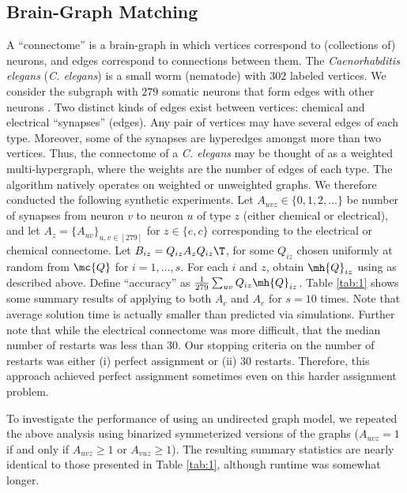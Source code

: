 \documentclass[10pt,journal,cspaper,compsoc]{IEEEtran}
\begin{document}


\subsection{Brain-Graph Matching} %
\label{sub:connectome_classification}

A ``connectome'' is a brain-graph in which vertices correspond to (collections of) neurons, and edges correspond to connections between them. The \emph{Caenorhabditis elegans} (\emph{C. elegans}) is a small worm (nematode) with $302$ labeled vertices.  We consider the subgraph with $279$ somatic neurons that form edges with other neurons \cite{WhiteBrenner86, Varshney2011}.  Two distinct kinds of edges exist between vertices: chemical and electrical ``synapses'' (edges). Any pair of vertices may have several edges of each type. Moreover, some of the synapses are hyperedges amongst more than two vertices.    Thus, the connectome of a \emph{C. elegans} may be thought of as a weighted multi-hypergraph, where the weights are the number of edges of each type.  The \qapm algorithm natively operates on weighted or unweighted graphs.  We therefore conducted the following synthetic experiments.  Let $A_{uvz} \in \{0,1,2,\ldots\}$ be number of synapses from neuron $v$ to neuron $u$ of type $z$ (either chemical or electrical), and let $A_z=\{A_{uv}\}_{u,v \in [279]}$ for $z \in \{e,c\}$ corresponding to the electrical or chemical connectome.  Let $B_{iz}=Q_{iz} A_z Q_{iz}\T$, for some $Q_{iz}$ chosen uniformly at random from $\mc{Q}$ for $i=1,\ldots,s$.  For each $i$ and $z$, obtain $\mh{Q}_{iz}$ using \qapm as described above.  Define ``accuracy'' as $\frac{1}{279}\sum_{uv} Q_{iz} \mh{Q}_{iz}$.  Table \ref{tab:1} shows some summary results of applying \qapm to both $A_c$ and $A_e$ for $s=10$ times.  Note that average solution time is actually smaller than predicted via simulations.  Further note that while the electrical connectome was more difficult, that the median number of restarts was less than $30$.  Our stopping criteria on the number of restarts was either (i) perfect assignment or (ii) 30 restarts.  Therefore, this approach achieved perfect assignment sometimes even on this harder assignment problem.

To investigate the performance of \qap using an undirected graph model, we repeated the above analysis using binarized symmeterized versions of the graphs ($A_{uvz}=1$ if and only if $A_{uvz}\geq 1$ or $A_{vuz} \geq 1$).  The resulting summary statistics are nearly identical to those presented in Table \ref{tab:1}, although runtime was somewhat longer.
\end{document}
